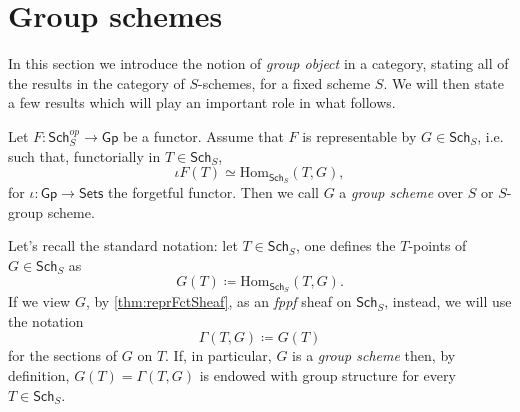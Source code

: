 \documentclass[../Main]{subfiles}
\begin{document}
\section{Group schemes}
In this section we introduce the notion of {\em group object}
in a category, stating all of the results in the category
of $S$-schemes, for a fixed scheme $S$.
We will then state a few results which will play an important role
in what follows.


\begin{defn}
	Let $F\colon \mathsf{Sch}_S^{op} \to \mathsf{Gp}$ be a functor.
	Assume that $F$ is representable by $G \in \mathsf{Sch}_{ S }$, i.e. such that, 
	functorially in $T \in \mathsf{Sch}_{ S }$,
	\begin{equation*}
		\iota F(T) \simeq \mathrm{Hom}_{\mathsf{Sch}_S} \left( T, G \right)
	,\end{equation*} 
	for $\iota\colon \mathsf{Gp} \to \mathsf{Sets}$ the forgetful functor.
	Then we call $G$ a {\em group scheme} over $S$
	or $S$-group scheme.
\end{defn}


\begin{rem}
	Let's recall the standard notation: let $T \in \mathsf{Sch}_{ S }$, one defines
	the $T$-points of $G \in \mathsf{Sch}_{ S }$ as
	\begin{equation*}
		G(T) \coloneqq \mathrm{Hom}_{\mathsf{Sch}_{ S }} \left( T, G \right)
	.\end{equation*} 
	If we view $G$, by \cref{thm:reprFctSheaf}, as an {\em fppf} sheaf on $\mathsf{Sch}_{ S }$, instead,
	we will use the notation
	\begin{equation*}
		\Gamma \left( T, G \right) \coloneqq G(T)
	\end{equation*}
	for the sections of $G$ on $T$.
	If, in particular, $G$ is a {\em group scheme} then, by definition,
	$G(T) = \Gamma(T,G)$ is endowed with group structure for every $T \in \mathsf{Sch}_{ S }$.
\end{rem}
\end{document}
